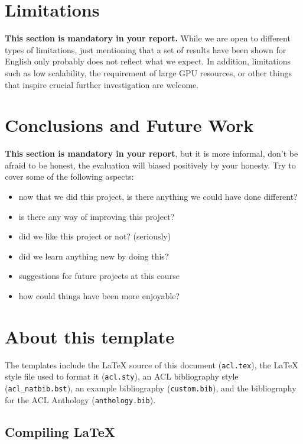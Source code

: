 \documentclass[11pt]{article}
\begin{document}
\section{Limitations}
\label{section:limitations}
\textbf{This section is mandatory in your report.}
While we are open to different types of limitations, just mentioning that a set of results have been shown for English only probably does not reflect what we expect. In addition, limitations such as low scalability, the requirement of large GPU resources, or other things that inspire crucial further investigation are welcome. 

\section{Conclusions and Future Work}
\label{section:conclusions}

\textbf{This section is mandatory in your report}, but it is more informal, don't be afraid to be honest, the evaluation will biased positively by your honesty. 
Try to cover some of the following aspects:
\begin{itemize}
	\item now that we did this project, is there anything we could have done different?
	\item is there any way of improving this project?
	\item did we like this project or not? (seriously)
	\item did we learn anything new by doing this?
	\item suggestions for future projects at this course
	\item how could things have been more enjoyable?
\end{itemize}


\newpage


\section{About this template}

The templates include the \LaTeX{} source of this document (\texttt{acl.tex}),
the \LaTeX{} style file used to format it (\texttt{acl.sty}),
an ACL bibliography style (\texttt{acl\_natbib.bst}),
an example bibliography (\texttt{custom.bib}),
and the bibliography for the ACL Anthology (\texttt{anthology.bib}).



\subsection{Compiling \LaTeX{}}
\end{document}
